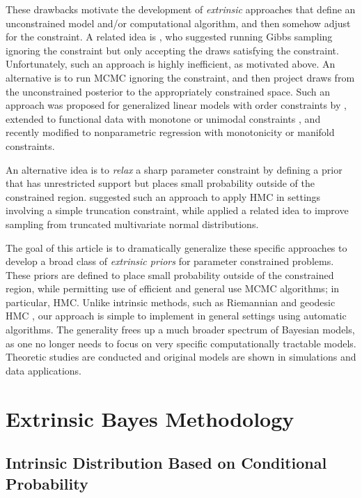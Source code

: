 \documentclass[10pt]{article}
\DeclareMathOperator{\1}{\mathbbm{1}}
\begin{document}
These drawbacks motivate the development of {\em extrinsic} approaches that define an unconstrained model and/or computational algorithm, and then somehow adjust for the constraint. A related idea is \cite{gelfand1992bayesian}, who suggested running Gibbs sampling ignoring the constraint but only accepting the draws satisfying the constraint. Unfortunately, such an approach is highly inefficient, as motivated above. An alternative is to run MCMC ignoring the constraint, and then project draws from the unconstrained posterior to the appropriately constrained space. Such an approach was proposed for generalized linear models with order constraints by \cite{dunson2003bayesian}, extended to functional data with monotone or unimodal constraints \citep{gunn2005transformation}, and recently modified to nonparametric regression with monotonicity \citep{lin2014monogp} or manifold \citep{lin2016extrinsic} constraints.

An alternative idea is to {\em relax} a sharp parameter constraint by defining a prior that has unrestricted support but places small probability outside of the constrained region. \cite{neal2011mcmc} suggested such an approach to apply HMC in settings involving a simple truncation constraint, while \cite{pakman2014exact} applied a related idea to improve sampling from truncated multivariate normal distributions.

The goal of this article is to dramatically generalize these specific approaches to develop a broad class of {\em extrinsic priors} for parameter constrained problems. These priors are defined to place small probability outside of the constrained region, while permitting use of efficient and general use MCMC algorithms; in particular, HMC. Unlike intrinsic methods, such as Riemannian and geodesic HMC \citep{girolami2011riemann,byrne2013geodesic}, our approach is simple to implement in general settings using automatic algorithms. The generality frees up a much broader spectrum of Bayesian models, as one no longer needs to focus on very specific computationally tractable models.
Theoretic studies are conducted and original models are shown in simulations and data applications.

\section{Extrinsic Bayes Methodology}

\subsection{Intrinsic Distribution Based on Conditional Probability}
\end{document}
